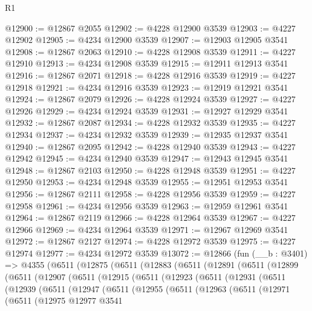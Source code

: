 \begin{lexlean}{R1}
\begin{coremodule}
@12900 := @12867 @2055
@12902 := @4228 @12900 @3539
@12903 := @4227 @12902
@12905 := @4234 @12900 @3539
@12907 := @12903 @12905 @3541
@12908 := @12867 @2063
@12910 := @4228 @12908 @3539
@12911 := @4227 @12910
@12913 := @4234 @12908 @3539
@12915 := @12911 @12913 @3541
@12916 := @12867 @2071
@12918 := @4228 @12916 @3539
@12919 := @4227 @12918
@12921 := @4234 @12916 @3539
@12923 := @12919 @12921 @3541
@12924 := @12867 @2079
@12926 := @4228 @12924 @3539
@12927 := @4227 @12926
@12929 := @4234 @12924 @3539
@12931 := @12927 @12929 @3541
@12932 := @12867 @2087
@12934 := @4228 @12932 @3539
@12935 := @4227 @12934
@12937 := @4234 @12932 @3539
@12939 := @12935 @12937 @3541
@12940 := @12867 @2095
@12942 := @4228 @12940 @3539
@12943 := @4227 @12942
@12945 := @4234 @12940 @3539
@12947 := @12943 @12945 @3541
@12948 := @12867 @2103
@12950 := @4228 @12948 @3539
@12951 := @4227 @12950
@12953 := @4234 @12948 @3539
@12955 := @12951 @12953 @3541
@12956 := @12867 @2111
@12958 := @4228 @12956 @3539
@12959 := @4227 @12958
@12961 := @4234 @12956 @3539
@12963 := @12959 @12961 @3541
@12964 := @12867 @2119
@12966 := @4228 @12964 @3539
@12967 := @4227 @12966
@12969 := @4234 @12964 @3539
@12971 := @12967 @12969 @3541
@12972 := @12867 @2127
@12974 := @4228 @12972 @3539
@12975 := @4227 @12974
@12977 := @4234 @12972 @3539
@13072 := @12866
    (fun (__b : @3401) =>
    @4355
      (@6511
        (@12875
          (@6511
            (@12883
              (@6511
                (@12891
                  (@6511
                    (@12899
                      (@6511
                        (@12907
                          (@6511
                            (@12915
                              (@6511
                                (@12923
                                  (@6511
                                    (@12931
                                      (@6511
                                        (@12939
                                          (@6511
                                            (@12947
                                              (@6511
                                                (@12955
                                                  (@6511
                                                    (@12963
                                                      (@6511
                                                        (@12971
                                                          (@6511
                                                            (@12975
                                                              @12977
                                                              @3541

\end{coremodule}
\end{lexlean}
